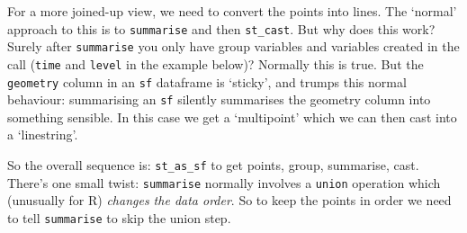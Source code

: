 \documentclass[
]{book}
\begin{document}
For a more joined-up view, we need to convert the points into lines. The `normal' approach to this is to \texttt{summarise} and then \texttt{st\_cast}. But why does this work? Surely after \texttt{summarise} you only have group variables and variables created in the call (\texttt{time} and \texttt{level} in the example below)? Normally this is true. But the \texttt{geometry} column in an \texttt{sf} dataframe is `sticky', and trumps this normal behaviour: summarising an \texttt{sf} silently summarises the geometry column into something sensible. In this case we get a `multipoint' which we can then cast into a `linestring'.

So the overall sequence is: \texttt{st\_as\_sf} to get points, group, summarise, cast. There's one small twist: \texttt{summarise} normally involves a \texttt{union} operation which (unusually for R) \emph{changes the data order}. So to keep the points in order we need to tell \texttt{summarise} to skip the union step.
\end{document}
